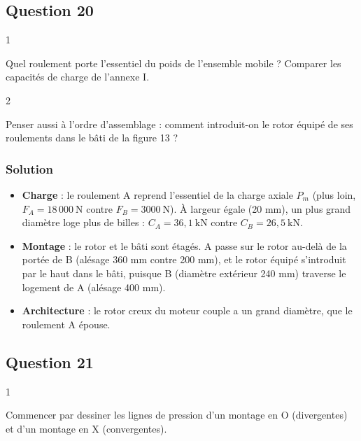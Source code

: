 \documentclass[11pt,a4paper]{article}
\providecommand{\tightlist}{\setlength{\itemsep}{0pt}\setlength{\parskip}{0pt}}
\begin{document}
\hypertarget{question-20}{%
\subsection{Question 20}\label{question-20}}

\begin{indication}{1}

Quel roulement porte l'essentiel du poids de l'ensemble mobile ? Comparer les capacités de charge de l'annexe I.

\end{indication}

\begin{indication}{2}

Penser aussi à l'ordre d'assemblage : comment introduit-on le rotor équipé de ses roulements dans le bâti de la figure 13 ?

\end{indication}

\hypertarget{solution-19}{%
\subsubsection{Solution}\label{solution-19}}

\begin{itemize}
\tightlist
\item
  \textbf{Charge} : le roulement A reprend l'essentiel de la charge axiale \(P_m\) (plus loin, \(F_A = 18\,000\ \text{N}\) contre \(F_B = 3000\ \text{N}\)). À largeur égale (20 mm), un plus grand diamètre loge plus de billes : \(C_A = 36{,}1\ \text{kN}\) contre \(C_B = 26{,}5\ \text{kN}\).
\item
  \textbf{Montage} : le rotor et le bâti sont étagés. A passe sur le rotor au-delà de la portée de B (alésage 360 mm contre 200 mm), et le rotor équipé s'introduit par le haut dans le bâti, puisque B (diamètre extérieur 240 mm) traverse le logement de A (alésage 400 mm).
\item
  \textbf{Architecture} : le rotor creux du moteur couple a un grand diamètre, que le roulement A épouse.
\end{itemize}

\hypertarget{question-21}{%
\subsection{Question 21}\label{question-21}}

\begin{indication}{1}

Commencer par dessiner les lignes de pression d'un montage en O (divergentes) et d'un montage en X (convergentes).

\end{indication}
\end{document}
